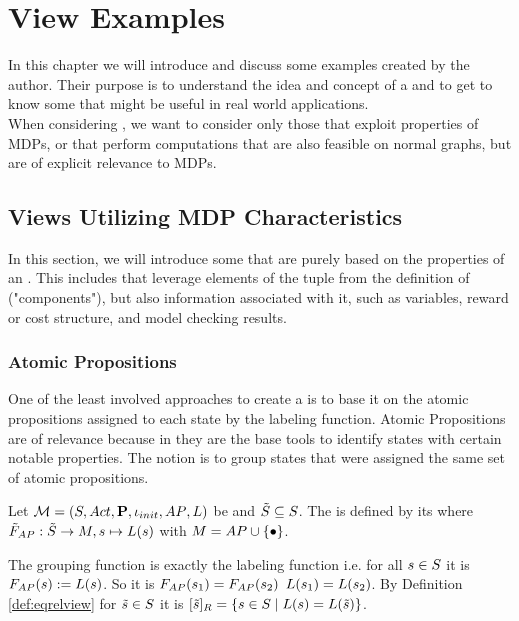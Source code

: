 \documentclass[preview]{standalone}
\begin{document}
 
\section{View Examples} \label{ch:viewexmp}
In this chapter we will introduce and discuss some \viewN examples created by the author. Their purpose is to understand the idea and concept of a \viewN and to get to know some \viewsN that might be useful in real world applications. \\
When considering \viewsN, we want to consider only those that exploit properties of MDPs, or that perform computations that are also feasible on normal graphs, but are of explicit relevance to MDPs.
\subsection{Views Utilizing MDP Characteristics}
In this section, we will introduce some \viewsN that are purely based on the properties of an \mdpN. This includes \viewsN that leverage elements of the tuple from the definition of \chgphsN ("\chgph components"), but also information associated with it, such as variables, reward or cost structure, and model checking results.
\subsubsection{Atomic Propositions}
One of the least involved approaches to create a \viewN is to base it on the atomic propositions assigned to each state by the labeling function. Atomic Propositions are of relevance because in they are the base tools to identify states with certain notable properties. The notion is to group states that were assigned the same set of atomic propositions.

\begin{definition}	
	Let ${{{\mathcal{M}}}} = {{({S}, {Act}, {\textbf{P}}, {\iota_{init}}, {AP}, {L})}}$ be \achgphN and ${\tilde{{S}}} \subseteq {S}$. The \viewN \viewatomicprops is defined by its \grpfctN \gfctatomicprops where $\gfctsubatomicprops : \smstates \to \imggrp, {\state}\mapsto{\labelingfct(\state)}$ with $\imggrp = \atomicprops \cup \remset$.
\end{definition}

The grouping function is exactly the labeling function i.e. for all ${s} \in {S}$ it is ${{F_{{{AP}}}}}({s}) := {L}({s})$. So it is ${{F_{{{AP}}}}}({s}_1) = {{F_{{{AP}}}}}({s}_2)$ \iffN ${L}({s}_1) = {L}({s}_2)$. By Definition \ref{def:eqrelview} for ${\tilde{{s}}} \in {S}$ it is ${{[{\tilde{{s}}}]_{{R}}}} = \{{s} \in {S} \mid {L}({s}) = {L}({\tilde{{s}}})\}$.
\end{document}
